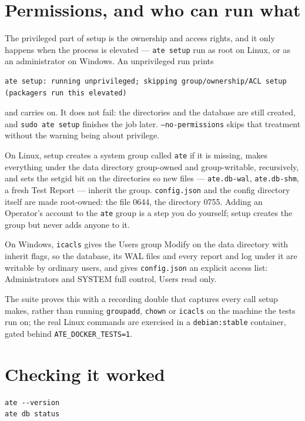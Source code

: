 \section{Permissions, and who can run what}

The privileged part of setup is the ownership and access rights, and it only happens when the
process is elevated --- \texttt{ate setup} run as root on Linux, or as an administrator on
Windows. An unprivileged run prints

\begin{lstlisting}[language=ATEShell]
ate setup: running unprivileged; skipping group/ownership/ACL setup (packagers run this elevated)
\end{lstlisting}

and carries on. It does not fail: the directories and the database are still created, and
\texttt{sudo ate setup} finishes the job later. \texttt{--no-permissions} skips that treatment
without the warning being about privilege.

On Linux, setup creates a system group called \texttt{ate} if it is missing, makes everything under
the data directory group-owned and group-writable, recursively, and sets the setgid bit on the
directories so new files --- \texttt{ate.db-wal}, \texttt{ate.db-shm}, a fresh Test Report ---
inherit the group. \texttt{config.json} and the config directory itself are made root-owned:
the file 0644, the directory 0755. Adding an Operator's account to the \texttt{ate} group is a
step you do yourself; setup creates the group but never adds anyone to it.

On Windows, \texttt{icacls} gives the Users group Modify on the data directory with inherit
flags, so the database, its WAL files and every report and log under it are writable by ordinary
users, and gives \texttt{config.json} an explicit access list: Administrators and SYSTEM full
control, Users read only.

The suite proves this with a recording double that captures every call setup makes, rather than
running \texttt{groupadd}, \texttt{chown} or \texttt{icacls} on the machine the tests run on; the
real Linux commands are exercised in a \texttt{debian:stable} container, gated behind
\texttt{ATE\_DOCKER\_TESTS=1}.

\section{Checking it worked}

\begin{lstlisting}[language=ATEShell]
ate --version
ate db status
\end{lstlisting}


